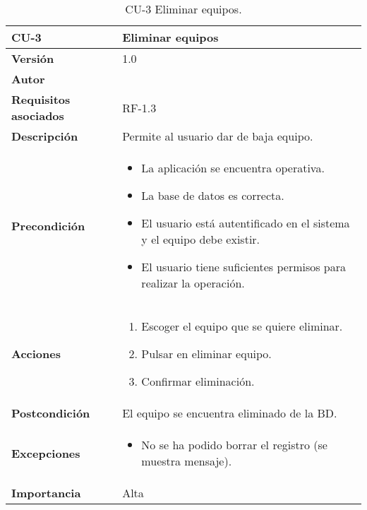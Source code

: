 \begin{table}[p]
	\centering
	\begin{tabularx}{\linewidth}{ p{} p{} }
		\toprule
		\textbf{CU-3}    & \textbf{ Eliminar equipos}\\
		\toprule
		\textbf{Versión}              & 1.0    \\
		\textbf{Autor}                & \@author{} \\
		\textbf{Requisitos asociados} & RF-1.3\\
		\textbf{Descripción}          & Permite al usuario dar de baja equipo. \\
		\textbf{Precondición}         &
		\begin{itemize}
			\tightlist
			\item La aplicación se encuentra operativa.
			\item La base de datos es correcta.
			\item El usuario está autentificado en el sistema y el equipo debe existir.
			\item El usuario tiene suficientes permisos para realizar la operación.
		\end{itemize}\\
		\textbf{Acciones}             &
		\begin{enumerate}
			\tightlist
			\item Escoger el equipo que se quiere eliminar.
			\item Pulsar en eliminar equipo.
			\item Confirmar eliminación.
		\end{enumerate}\\
		\textbf{Postcondición}        & El equipo se encuentra eliminado de la BD.\\
		\textbf{Excepciones}          &
		\begin{itemize}
			\tightlist
			\item No se ha podido borrar el registro (se muestra mensaje).
		\end{itemize}\\
		\textbf{Importancia}          & Alta\\
		\bottomrule
	\end{tabularx}
	\caption{CU-3 Eliminar equipos.}\label{tab:table-3}
\end{table}

